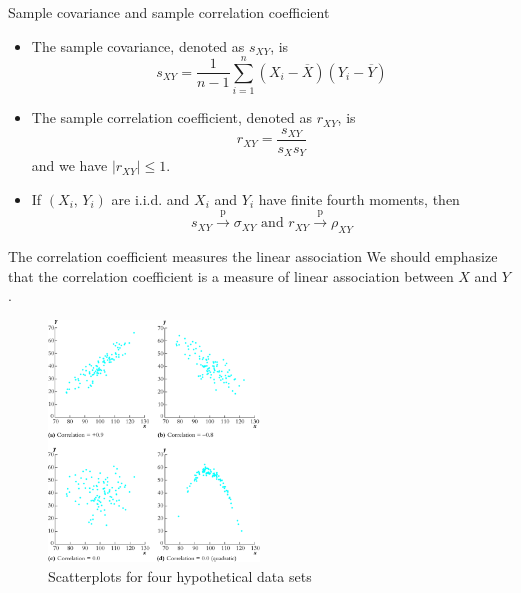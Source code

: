 \documentclass[presentation]{beamer}
\begin{document}
\begin{frame}[label={sec:org45e8dc1}]{Sample covariance and sample correlation coefficient}
\begin{itemize}
\item The \alert{sample covariance}, denoted as \(s_{XY}\), is
\[ s_{XY} = \frac{1}{n-1}\sum^n_{i=1}(X_i - \overline{X})(Y_i -
  \overline{Y}) \]

\item The \alert{sample correlation coefficient}, denoted as \(r_{XY}\), is
\[ r_{XY} = \frac{s_{XY}}{s_X s_Y} \]
and we have \(|r_{XY}| \leq 1\).

\item If \((X_i,\, Y_i)\) are i.i.d. and \(X_i\) and \(Y_i\) have finite fourth
moments, then
\[ s_{XY} \xrightarrow{\text{ p }} \sigma_{XY} \text{ and } r_{XY}
  \xrightarrow{\text{ p } } \rho_{XY} \]
\end{itemize}
\end{frame}

\begin{frame}[label={sec:org1c71f65}]{The correlation coefficient measures the linear association}
We should emphasize that the correlation coefficient is a measure of
linear association between \(X\) and \(Y\).

\begin{figure}[htbp]
\centering
\includegraphics[width=0.5\textwidth]{figure/fig-3-3.png}
\caption{\label{fig:orgea3eaa0}
Scatterplots for four hypothetical data sets}
\end{figure}
\end{frame}
\end{document}

